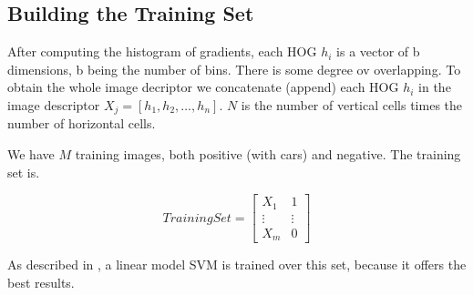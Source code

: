 \subsection{Building the Training Set}

After computing the histogram of gradients, each HOG $h_i$ is a vector of b dimensions, b being the number of bins. There is some degree ov overlapping. To obtain the whole image decriptor we concatenate (append) each HOG $h_i$ in the image descriptor $X_j = [h_1, h_2, \dots , h_n] $. $N$ is the number of vertical cells times the number of horizontal cells.

We have $M$ training images, both positive (with cars) and negative. The training set is.

\begin{equation}
Training Set = 
\begin{bmatrix} 
  X_1   & 1\\ 
  \vdots & \vdots\\
  X_m & 0
\end{bmatrix}
\end{equation}

As described in \cite{Dalal05histogramsof}, a linear model SVM is trained over this set, because it offers the best results.








